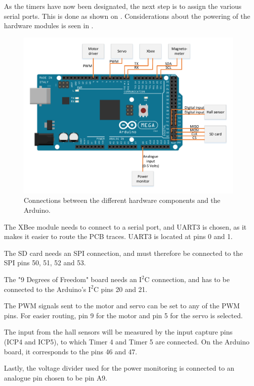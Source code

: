 As the timers have now been designated, the next step is to assign the various serial ports. This is done as shown on . Considerations about the powering of the hardware modules is seen in .	


\begin{figure}[H]
	\centering
	\includegraphics[scale=0.75]{figures/MegaSetup.pdf}
	\caption{Connections between the different hardware components and the Arduino.\cite{ArduMega}}
	\label{MegaSetup}
\end{figure}

The XBee module needs to connect to a serial port, and UART3 is chosen, as it makes it easier to route the PCB traces. UART3 is located at pins 0 and 1. 

The SD card needs an SPI connection, and must therefore be connected to the SPI pins 50, 51, 52 and 53. 

The "9 Degrees of Freedom" board needs an $\text{I}^2\text{C}$ connection, and has to be connected to the Arduino's $\text{I}^2\text{C}$ pins 20 and 21. 

The PWM signals sent to the motor and servo can be set to any of the PWM pins. For easier routing, pin 9 for the motor and pin 5 for the servo is selected.

The input from the hall sensors will be measured by the input capture pins (ICP4 and ICP5), to which Timer 4 and Timer 5 are connected. On the Arduino board, it corresponds to the pins 46 and 47.

Lastly, the voltage divider used for the power monitoring is connected to an analogue pin chosen to be pin A9.

